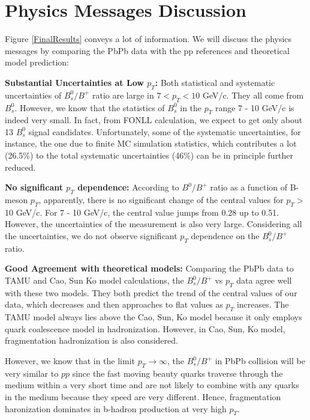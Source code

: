 \section{Physics Messages Discussion}

Figure \ref{FinalResults} conveys a lot of information. We will discuss the physics messages by comparing the PbPb data with the pp references and theoretical model prediction:



\textbf{Substantial Uncertainties at Low $p_T$:} Both statistical and systematic uncertainties of $B^0_s/B^+$ ratio are large in $7 < p_T < 10$ GeV/c. They all come from $B^0_s$. However, we know that the statistics of $B^0_s$ in the $p_T$ range 7 - 10 GeV/c is indeed very small. In fact, from FONLL calculation, we expect to get only about 13 $B^0_s$ signal candidates. Unfortunately, some of the systematic uncertainties, for instance, the one due to finite MC simulation statistics, which contributes a lot (26.5\%) to the total systematic uncertainties (46\%) can be in principle further reduced. 

\textbf{No significant $p_T$ dependence:} According to $B^0/B^+$ ratio as a function of B-meson $p_T$, apparently, there is no significant change of the central values for $p_T >$10 GeV/c. For 7 - 10 GeV/c, the central value jumps from 0.28 up to 0.51. However, the uncertainties of the measurement is also very large. Considering all the uncertainties, we do not observe significant $p_T$ dependence on the $B^0_s/B^+$ ratio.

\textbf{Good Agreement with theoretical models:} Comparing the PbPb data to TAMU and Cao, Sun Ko model calculations, the $B^0_s/B^+$ vs $p_T$ data agree well with these two models. They both predict the trend of the central values of our data, which decreases and then approaches to flat values as $p_T$ increases. The TAMU model always lies above the Cao, Sun, Ko model because it only employs quark coalescence model in hadronization. However, in Cao, Sun, Ko model, fragmentation hadronization is also considered. 

However, we know that in the limit $p_T \rightarrow \infty$, the $B^0_s/B^+$ in PbPb collision will be very similar to $pp$ since the fast moving beauty quarks traverse through the medium within a very short time and are not likely to combine with any quarks in the medium because they speed are very different. Hence, fragmentation haronization dominates in b-hadron production at very high $p_T$. 

